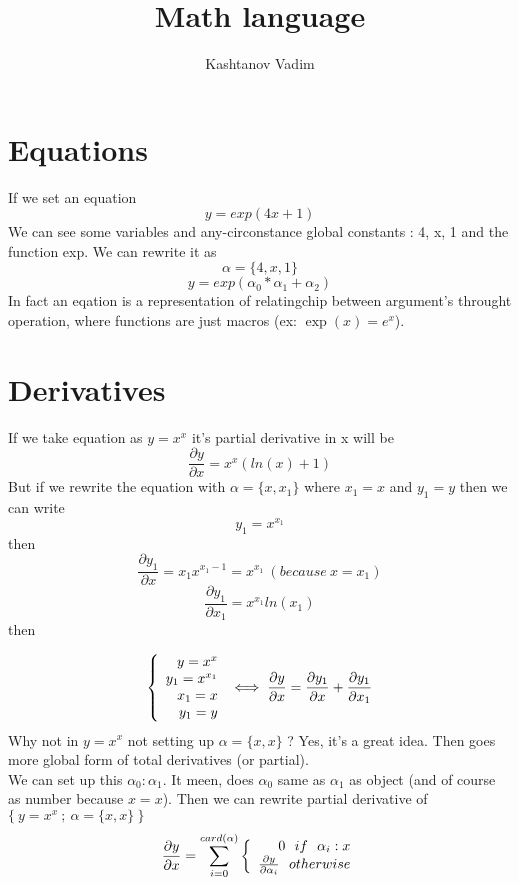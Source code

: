 \documentclass[11pt]{article}
\title{\textbf{Math language}}
\author{Kashtanov Vadim}
\date{}
\begin{document}
\maketitle
\thispagestyle{empty}

\section{Equations}
If we set an equation \[y = exp(4x + 1)\] We can see some variables and any-circonstance global constants : 4, x, 1 and the function exp. We can rewrite it as \[\alpha=\{4,x,1\}\] \[y = exp(\alpha_{0} * \alpha_1 + \alpha_2)\]
In fact an eqation is a representation of relatingchip between argument's throught operation, where functions are just macros (ex: $\exp(x) = e^{x}$).

\section{Derivatives}
If we take equation as $y = x^{x}$ it's partial derivative in x will be \[\frac{\partial y}{\partial x} = x^{x}(ln(x)+1)\]
But if we rewrite the equation with $\alpha = \{x,x_1\}$ where $x_1 = x$ and $y_{1} = y$ then we can write
\[y_{1} = x^{x_{1}}\]
then
\[\frac{\partial y_{1}}{\partial x} = x_{1}x^{x_{1}-1} = x^{x_{1}} \ (because\ x=x_{1})\]
\[\frac{\partial y_{1}}{\partial x_{1}} = x^{x_{1}} ln (x_{1})\]
then

\[
\left \{
\begin{array}{r c l}
	y = x^{x} \\
	y_1 = x^{x_{1}} \\
	x_{1} = x \\
	y_1 = y
\end{array}
\right .
\iff
\frac{\partial y}{\partial x} = \frac{\partial y_{1}}{\partial x} + \frac{\partial y_{1}}{\partial x_{1}}
\]
Why not in $y = x^{x}$ not setting up $\alpha = \{x,x\}$ ? Yes, it's a great idea. Then goes more global form of total derivatives (or partial). 
\\
We can set up this $\alpha_{0} : \alpha_{1}$. It meen, does $\alpha_{0}$ same as $\alpha_{1}$ as object (and of course as number because $x=x$). Then we can rewrite partial derivative of $\{\ y=x^{x} \ ; \ \alpha = \{x,x\}\ \}$
\[
\frac{\partial y}{\partial x} = \sum_{i=0}^{card(\alpha)}
\left \{
\begin{array}{r c l}
	0 \ \ if \ \  \alpha_{i} : x \\
	\frac{\partial y}{\partial \alpha_{i}} \ \ otherwise
\end{array}
\right .
\]
\end{document}
